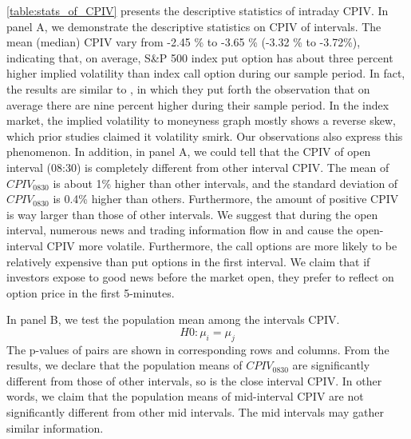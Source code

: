 \autoref{table:stats_of_CPIV} presents the descriptive statistics of intraday CPIV. In panel A, we demonstrate the descriptive statistics on CPIV of intervals. The mean (median) CPIV vary from -2.45 \% to -3.65 \% (-3.32 \% to -3.72\%), indicating that, on average, S\&P 500 index put option has about three percent higher implied volatility than index call option during our sample period. In fact, the results are similar to \textcite{atilgan2015implied}, in which they put forth the observation that on average there are nine percent higher during their sample period. In the index market, the implied volatility to moneyness graph mostly shows a reverse skew, which prior studies \parencite{zhang2008implied} claimed it volatility smirk. Our observations also express this phenomenon. In addition, in panel A, we could tell that the CPIV of open interval (08:30) is completely different from other interval CPIV. The mean of $CPIV_{0830}$ is about 1\% higher than other intervals, and the standard deviation of $CPIV_{0830}$ is 0.4\% higher than others. Furthermore, the amount of positive CPIV is way larger than those of other intervals. We suggest that during the open interval, numerous news and trading information flow in and cause the open-interval CPIV more volatile. Furthermore, the call options are more likely to be relatively expensive than put options in the first interval. We claim that if investors expose to good news before the market open, they prefer to reflect on option price in the first 5-minutes.  

In panel B, we test the population mean among the intervals CPIV. 
\begin{equation}
H0: \mu _{i} = \mu _{j}
\end{equation}
The p-values of pairs are shown in corresponding rows and columns. From the results, we declare that the population means of $CPIV_{0830}$ are significantly different from those of other intervals, so is the close interval CPIV. In other words, we claim that the population means of mid-interval CPIV are not significantly different from other mid intervals. The mid intervals may gather similar information. 






%


